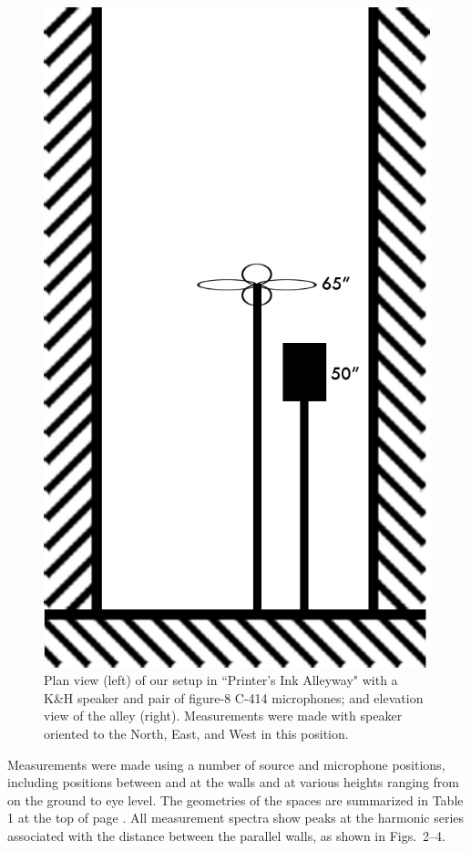 \documentclass{aes137}
\begin{document}
\begin{figure}
\begin{minipage}[b]{0.41\linewidth}
\includegraphics[width=\textwidth]{images/alleyway_lookingdown.png}
\end{minipage}

\caption{Plan view (left) of our setup in ``Printer's Ink Alleyway"
  with a K\&H speaker and pair of figure-8 C-414 microphones; and
  elevation view of the alley (right). Measurements were made with
  speaker oriented to the North, East, and West in this position.}
\end{figure}

Measurements were made using a number of source and microphone
positions, including positions between and at the walls and at various
heights ranging from on the ground to eye level. The geometries of the
spaces are summarized in Table 1 at the top of page
\pageref{table:geometries}. All measurement spectra show peaks at the
harmonic series associated with the distance between the parallel
walls, as shown in Figs.~2--4.
\end{document}
